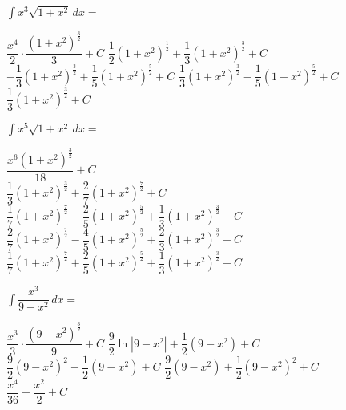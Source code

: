 \begin{questions}
    \question $\int x^3\sqrt{1 + x^2} \, dx = $ \\

    \begin{oneparchoices}
        \choice $\dfrac{x^4}{2} \cdot \dfrac{\left(1 + x^2\right)^{\frac{3}{2}}}{3} + C$
        \choice $\dfrac{1}{2}\left(1 + x^2\right)^{\frac{1}{2}} + \dfrac{1}{3}\left(1 + x^2\right)^{\frac{3}{2}} + C$ \\[11pt]
        \makebox[0.035\textwidth] \choice $-\dfrac{1}{3}\left(1 + x^2\right)^{\frac{3}{2}} + \dfrac{1}{5}\left(1 + x^2\right)^{\frac{5}{2}} + C$
        \choice $\dfrac{1}{3}\left(1 + x^2\right)^{\frac{3}{2}} - \dfrac{1}{5}\left(1 + x^2\right)^{\frac{5}{2}} + C$ \\[11pt]
        \makebox[0.035\textwidth] \choice $\dfrac{1}{3}\left(1 + x^2\right)^{\frac{3}{2}} + C$
    \end{oneparchoices} \par \horizontalline

    \question $\int x^5\sqrt{1 + x^2} \, dx = $ \\
    
    \begin{oneparchoices}
        \choice $\dfrac{x^6\left(1 + x^2\right)^{\frac{3}{2}}}{18} + C$ \\[11pt]
        \makebox[0.035\textwidth] \choice $\dfrac{1}{3}\left(1 + x^2\right)^{\frac{3}{2}} + \dfrac{2}{7}\left(1 + x^2\right)^{\frac{7}{2}} + C$ \\[11pt]
        \makebox[0.035\textwidth] \choice $\dfrac{1}{7}\left(1 + x^2\right)^{\frac{7}{2}} - \dfrac{2}{5}\left(1 + x^2\right)^{\frac{5}{2}} + \dfrac{1}{3}\left(1 + x^2\right)^{\frac{3}{2}} + C$ \\[11pt]
        \makebox[0.035\textwidth] \choice $\dfrac{2}{7}\left(1 + x^2\right)^{\frac{7}{2}} - \dfrac{4}{5}\left(1 + x^2\right)^{\frac{5}{2}} + \dfrac{2}{3}\left(1 + x^2\right)^{\frac{3}{2}} + C$ \\[11pt]
        \makebox[0.035\textwidth] \choice $\dfrac{1}{7}\left(1 + x^2\right)^{\frac{7}{2}} + \dfrac{2}{5}\left(1 + x^2\right)^{\frac{5}{2}} + \dfrac{1}{3}\left(1 + x^2\right)^{\frac{3}{2}} + C$ 
    \end{oneparchoices} \par \horizontalline

    \question $\int \dfrac{x^3}{9 - x^2} \, dx = $ \\

    \begin{oneparchoices}
        \choice $\dfrac{x^3}{3} \cdot \dfrac{\left(9 - x^2\right)^{\frac{3}{2}}}{9} + C$
        \choice $\dfrac{9}{2}\ln |9 - x^2| + \dfrac{1}{2}\left(9 - x^2\right) + C$ \\[11pt]
        \makebox[0.035\textwidth] \choice $\dfrac{9}{2}\left(9 - x^2\right)^2 - \dfrac{1}{2}\left(9 - x^2\right) + C$
        \choice $\dfrac{9}{2}\left(9 - x^2\right) + \dfrac{1}{2}\left(9 - x^2\right)^2 + C$ \\[11pt]
        \makebox[0.035\textwidth] \choice $\dfrac{x^4}{36} - \dfrac{x^2}{2} + C$
    \end{oneparchoices} \par \horizontalline


\end{questions}
